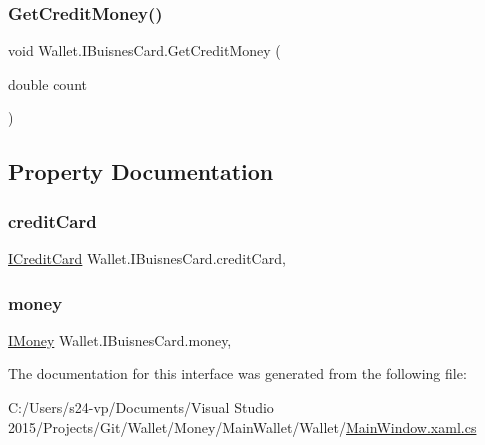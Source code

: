 \subsubsection{\texorpdfstring{Get\+Credit\+Money()}{GetCreditMoney()}}
{\footnotesize\ttfamily void Wallet.\+I\+Buisnes\+Card.\+Get\+Credit\+Money (\begin{DoxyParamCaption}\item[{double}]{count }\end{DoxyParamCaption})}



\subsection{Property Documentation}
\hypertarget{interface_wallet_1_1_i_buisnes_card_a53715ee7f0484407fe5a238a1f442148}{}\label{interface_wallet_1_1_i_buisnes_card_a53715ee7f0484407fe5a238a1f442148} 
\subsubsection{\texorpdfstring{credit\+Card}{creditCard}}
{\footnotesize\ttfamily \hyperlink{interface_wallet_1_1_i_credit_card}{I\+Credit\+Card} Wallet.\+I\+Buisnes\+Card.\+credit\+Card\hspace{0.3cm}{\ttfamily [get]}, {\ttfamily [set]}}

\hypertarget{interface_wallet_1_1_i_buisnes_card_aec4923ff6cdbd90be1f3ecb28d19501b}{}\label{interface_wallet_1_1_i_buisnes_card_aec4923ff6cdbd90be1f3ecb28d19501b} 
\subsubsection{\texorpdfstring{money}{money}}
{\footnotesize\ttfamily \hyperlink{interface_wallet_1_1_i_money}{I\+Money} Wallet.\+I\+Buisnes\+Card.\+money\hspace{0.3cm}{\ttfamily [get]}, {\ttfamily [set]}}



The documentation for this interface was generated from the following file\+:\begin{DoxyCompactItemize}
\item 
C\+:/\+Users/s24-\/vp/\+Documents/\+Visual Studio 2015/\+Projects/\+Git/\+Wallet/\+Money/\+Main\+Wallet/\+Wallet/\hyperlink{_main_window_8xaml_8cs}{Main\+Window.\+xaml.\+cs}\end{DoxyCompactItemize}
